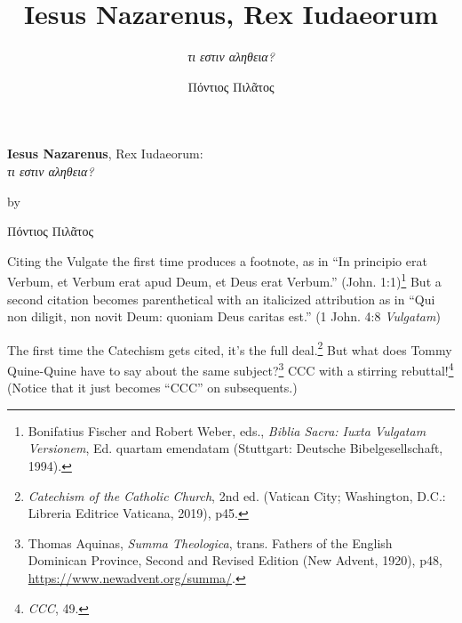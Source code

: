 \documentclass[
    12pt,
    letterpaper,
    oneside,
    noraggedright
]{turabian-researchpaper}
\title{{\textbf{Iesus Nazarenus}, Rex Iudaeorum}}
\subtitle{{\emph{τι εστιν αληθεια?}}}
\author{{Πόντιος Πιλᾶτος}}
\begin{document}
    \begin{center}

    \thispagestyle{empty}
    \vspace*{1in}
    \begin{singlespace}
        {\textbf{Iesus Nazarenus}, Rex Iudaeorum}:\\
    {\emph{τι εστιν αληθεια?}}
        \end{singlespace}
    \vspace{2in - \baselineskip}

    by
    \vspace{2in - \baselineskip}

    {Πόντιος Πιλᾶτος}

    \vspace{2in - \baselineskip}

    \end{center}
    \newpage
    \setcounter{page}{1}

Citing the Vulgate the first time produces a footnote, as in ``In
principio erat Verbum, et Verbum erat apud Deum, et Deus erat Verbum.''
{(John. 1:1)\footnote{Bonifatius Fischer and Robert Weber, eds.,
  \emph{Biblia Sacra: Iuxta Vulgatam Versionem}, Ed. quartam emendatam
  (Stuttgart: Deutsche Bibelgesellschaft, 1994).}} But a second citation
becomes parenthetical with an italicized attribution as in ``Qui non
diligit, non novit Deum: quoniam Deus caritas est.'' {(1 John. 4:8{
\emph{Vulgatam}})}

The first time the Catechism gets cited, it's the full deal.\footnote{\emph{Catechism
  of the Catholic Church}, 2nd ed. (Vatican City; Washington, D.C.:
  Libreria Editrice Vaticana, 2019), p45.} But what does Tommy
Quine-Quine have to say about the same subject?\footnote{Thomas Aquinas,
  \emph{Summa Theologica}, trans. Fathers of the English Dominican
  Province, Second and Revised Edition (New Advent, 1920), p48,
  \url{https://www.newadvent.org/summa/}.} CCC with a stirring
rebuttal!\footnote{\emph{CCC}, 49.} (Notice that it just becomes ``CCC''
on subsequents.)
\end{document}
